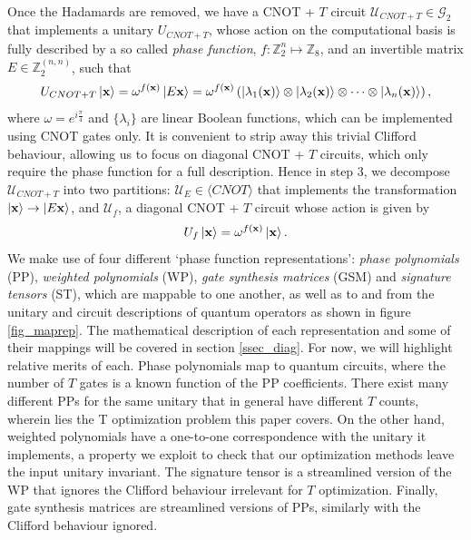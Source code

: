 \documentclass[notitlepage]{article}
\theoremstyle{definition}
\theoremstyle{problem}
\theoremstyle{lemma}
\begin{document}
Once the Hadamards are removed, we have a CNOT + $T$ circuit $\mathcal{U}_{CNOT+T} \in \mathcal{G}_2$ that implements a unitary $U_{CNOT+T}$, whose action on the computational basis is fully described by a so called \emph{phase function}, $f: \mathbb{Z}_2^n \mapsto \mathbb{Z}_8$, and an invertible matrix $E \in \mathbb{Z}_2^{(n,n)}$, such that
\begin{equation}
U_{CNOT+T}\left\vert{\mathbf{x}}\right\rangle = \omega^{f(\mathbf{x})}\left\vert{E\mathbf{x}}\right\rangle = \omega^{f(\mathbf{x})}\left(\left\vert{\lambda_1(\mathbf{x})}\right\rangle\otimes\left\vert{\lambda_2(\mathbf{x})}\right\rangle\otimes\dots\otimes\left\vert{\lambda_n(\mathbf{x})}\right\rangle\right),
\end{equation}
where $\omega = e^{i\frac{\pi}{4}}$ and $\{\lambda_i \}$ are linear Boolean functions, which can be implemented using CNOT gates only. It is convenient to strip away this trivial Clifford behaviour, allowing us to focus on diagonal CNOT + $T$ circuits, which only require the phase function for a full description.
Hence in step 3, we decompose $\mathcal{U}_{CNOT+T}$ into two partitions: $\mathcal{U}_E \in \langle CNOT \rangle$ that implements the transformation $\left\vert{\mathbf{x}}\right\rangle \rightarrow \left\vert{E\mathbf{x}}\right\rangle$, and $\mathcal{U}_f$, a diagonal CNOT + $T$ circuit whose action is given by
\begin{equation}
U_f\left\vert{\mathbf{x}}\right\rangle = \omega^{f(\mathbf{x})}\left\vert{\mathbf{x}}\right\rangle.
\end{equation}
We make use of four different `phase function representations': \emph{phase polynomials} (PP), \emph{weighted polynomials} (WP), \emph{gate synthesis matrices} (GSM) and \emph{signature tensors} (ST), which are mappable to one another, as well as to and from the unitary and circuit descriptions of quantum operators as shown in figure \ref{fig_maprep}. The mathematical description of each representation and some of their mappings will be covered in section \ref{ssec_diag}. For now, we will highlight relative merits of each.
Phase polynomials map to quantum circuits, where the number of $T$ gates is a known function of the PP coefficients.
There exist many different PPs for the same unitary that in general have different $T$ counts, wherein lies the T optimization problem this paper covers. On the other hand, weighted polynomials have a one-to-one correspondence with the unitary it implements, a property we exploit to check that our optimization methods leave the input unitary invariant. The signature tensor is a streamlined version of the WP that ignores the Clifford behaviour irrelevant for $T$ optimization. Finally, gate synthesis matrices are streamlined versions of PPs, similarly with the Clifford behaviour ignored.
\end{document}
